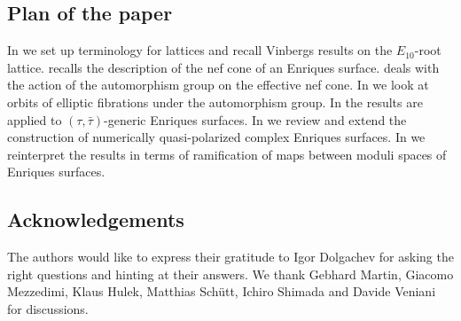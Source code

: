 \documentclass{amsart}
\theoremstyle{definition}
\theoremstyle{plain}
\newcommand{\taubar}{\bar{\tau}}
\begin{document}
\subsection*{Plan of the paper}
In  we set up terminology for lattices and recall Vinbergs results on the $E_{10}$-root lattice.  recalls the description of the nef cone of an Enriques surface.
 deals with the action of the automorphism group on the effective nef cone.
In  we look at orbits of elliptic fibrations under the automorphism group.
In  the results are applied to $(\tau,\taubar)$-generic Enriques surfaces.
In  we review and extend the construction of numerically quasi-polarized complex Enriques surfaces.
In  we reinterpret the results in terms of ramification of maps between moduli spaces of Enriques surfaces.

\subsection*{Acknowledgements}
The authors would like to express their gratitude to Igor Dolgachev for asking the right questions and hinting at their answers.
We thank Gebhard Martin, Giacomo Mezzedimi, Klaus Hulek, Matthias Schütt, Ichiro Shimada and Davide Veniani for discussions.
\end{document}
